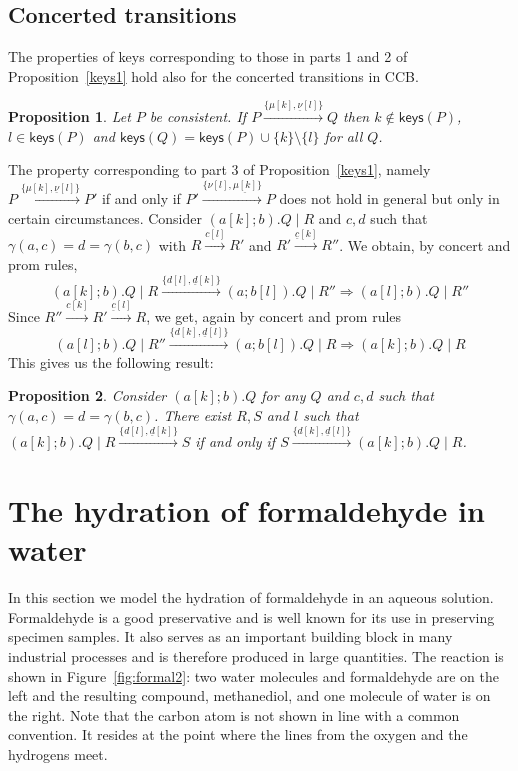 \documentclass[preprint,12pt]{elsarticle}
\newcommand{\paral}{\; \vert \;}
\newcommand{\keys}[1]{\mathsf{keys}(#1)}
\newtheorem{proposition}{Proposition}
\begin{document}
\subsection{Concerted transitions}
The properties of keys corresponding to those in parts 1 and 2 of Proposition~\ref{keys1} hold also 
for the concerted transitions in CCB.

\begin{proposition}\label{keys2}
Let $P$ be consistent. If $P \xrightarrow{\{\mu[k], \underline{\nu}[l]\}} Q$ then $k \notin \keys{P}$, $l \in \keys{P}$  
	and $\keys{Q}=\keys{P} \cup \{k\}\setminus\{l\}$ for all $Q$.\\
\end{proposition}

The property corresponding to part 3 of Proposition~\ref{keys1},
namely $P \xrightarrow{\{\mu[k],\underline{\nu}[l]\}} P'$ if and only if 
$P' \xrightarrow{\{\nu[l],\underline{\mu[k]}\}} P$
does not hold in general but only in 
certain circumstances. Consider $(a[k];b).Q \paral R$ and $c,d$ such that $\gamma(a,c)=d=\gamma(b,c)$ with
$R\xrightarrow{c[l]} R'$ and $R' \xrightarrow{\underline{c}[k]} R''$. We obtain, by concert and prom rules,
$$(a[k];b).Q \paral R \xrightarrow{\{d[l], \underline{d}[k]\}} (a;b[l]).Q \paral R'' \Rightarrow 
(a[l];b).Q \paral R''$$
Since $R'' \xrightarrow{c[k]} R' \xrightarrow{\underline{c}[l]}R$,
we get, again by concert and prom rules
$$(a[l];b).Q \paral R'' \xrightarrow{\{d[k], \underline{d}[l]\}} (a;b[l]).Q \paral R
  \Rightarrow (a[k];b).Q \paral R$$
This gives us the following result:

\begin{proposition}
Consider $(a[k];b).Q$ for any $Q$ and $c,d$ such that $\gamma(a,c)=d=\gamma(b,c)$. There exist
$R,S$ and $l$ such that $(a[k];b).Q \paral R \xrightarrow{\{d[l], \underline{d}[k]\}} S$ if and only if
$S \xrightarrow{\{d[k], \underline{d}[l]\}} (a[k];b).Q \paral R$.
\end{proposition}

\section{The hydration of formaldehyde in water}
\label{sec:bigexample}

In this section we model the hydration of formaldehyde in an aqueous solution.
Formaldehyde
is a good preservative and is well known for its use in preserving specimen samples.
It also serves as an important building block in many industrial processes and is therefore
produced in large quantities.
The reaction is shown in Figure~\ref{fig:formal2}: two water molecules and formaldehyde are on 
the left and the resulting compound, methanediol, and one molecule of water is on the right.
Note that the carbon atom is not shown in line with a common convention. It resides at the point 
where the lines from the oxygen and the hydrogens meet.
\end{document}
